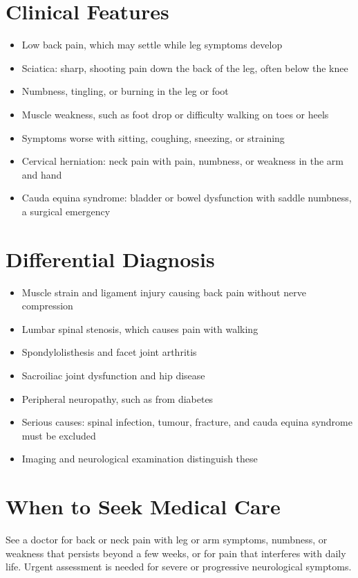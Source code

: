 \section*{Clinical Features}
\begin{itemize}
    \item Low back pain, which may settle while leg symptoms develop
    \item Sciatica: sharp, shooting pain down the back of the leg, often below the knee
    \item Numbness, tingling, or burning in the leg or foot
    \item Muscle weakness, such as foot drop or difficulty walking on toes or heels
    \item Symptoms worse with sitting, coughing, sneezing, or straining
    \item Cervical herniation: neck pain with pain, numbness, or weakness in the arm and hand
    \item Cauda equina syndrome: bladder or bowel dysfunction with saddle numbness, a surgical emergency
\end{itemize}

\section*{Differential Diagnosis}
\begin{itemize}
    \item Muscle strain and ligament injury causing back pain without nerve compression
    \item Lumbar spinal stenosis, which causes pain with walking
    \item Spondylolisthesis and facet joint arthritis
    \item Sacroiliac joint dysfunction and hip disease
    \item Peripheral neuropathy, such as from diabetes
    \item Serious causes: spinal infection, tumour, fracture, and cauda equina syndrome must be excluded
    \item Imaging and neurological examination distinguish these
\end{itemize}

\section*{When to Seek Medical Care}
See a doctor for back or neck pain with leg or arm symptoms, numbness, or weakness that persists beyond a few weeks, or for pain that interferes with daily life. Urgent assessment is needed for severe or progressive neurological symptoms.

